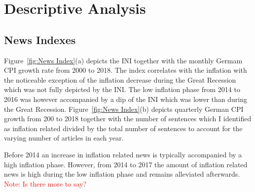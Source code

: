 \documentclass[review]{elsarticle}
\begin{document}
\section{Descriptive Analysis} \label{sec:Descriptive Analysis}

\subsection{News Indexes}\label{sec:News Indexes}

Figure~\ref{fig:News Index}(a) depicts the INI together with the monthly Germam CPI growth rate from 2000 to 2018. The index correlates with the inflation with the noticeable exception of the inflation decrease during the Great Recession which was not fully depicted by the INI. The low inflation phase from 2014 to 2016 was however accompanied by a dip of the INI which was lower than during the Great Recession. 
Figure~\ref{fig:News Index}(b) depicts quarterly German CPI growth from 200 to 2018 together with the number of sentences which I identified as inflation related divided by the total number of sentences to account for the varying number of articles in each year.


Before 2014 an increase in inflation related news is typically accompanied by a high inflation phase. However, from 2014 to 2017 the amount of inflation related news is high during the low inflation phase and remains alleviated afterwards. 
\\
\textcolor{red}{Note: Is there more to say?}
\end{document}
